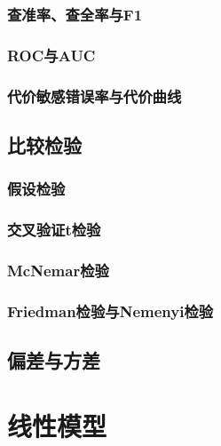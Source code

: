 \documentclass{article}
\begin{document}
\subsubsection{查准率、查全率与F1}

\subsubsection{ROC与AUC}

\subsubsection{代价敏感错误率与代价曲线}

\subsection{比较检验}

\subsubsection{假设检验}

\subsubsection{交叉验证t检验}

\subsubsection{McNemar检验}

\subsubsection{Friedman检验与Nemenyi检验}

\subsection{偏差与方差}

\newpage
 
\section{线性模型}
\end{document}
